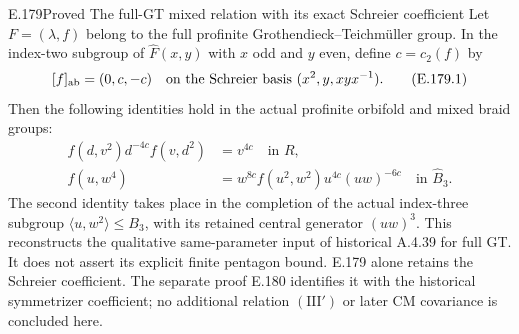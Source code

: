 \begin{result}{E.179}{Proved}
{The full-GT mixed relation with its exact Schreier coefficient}
Let \(F=(\lambda,f)\) belong to the full profinite
Grothendieck--Teichmüller group.  In the index-two
subgroup of \(\widehat F(x,y)\) with \(x\) odd and
\(y\) even, define \(c=c_2(f)\) by
\[
 [f]_{\rm ab}=(0,c,-c)
       \quad\hbox{on the Schreier basis }
                       (x^2,y,xyx^{-1}).
\tag{E.179.1}
\]
Then the following identities hold in the actual
profinite orbifold and mixed braid groups:
\[
 \begin{aligned}
 f(d,v^2)d^{-4c}f(v,d^2)&=v^{4c}
                         \quad\text{in }R,\\
 f(u,w^4)&=w^{8c}f(u^2,w^2)u^{4c}(uw)^{-6c}
                         \quad\text{in }\widehat B_3 .
 \end{aligned}
\tag{E.179.2}
\]
The second identity takes place in the completion
of the actual index-three subgroup
\(\langle u,w^2\rangle\leq B_3\), with its retained
central generator \((uw)^3\).
This reconstructs the qualitative same-parameter
input of historical A.4.39 for full GT.  It does
not assert its explicit finite pentagon bound.
E.179 alone retains the Schreier coefficient.
The separate proof E.180 identifies it with the
historical symmetrizer coefficient; no additional
relation \((\mathrm{III}\prime)\) or later CM
covariance is concluded here.
\end{result}

